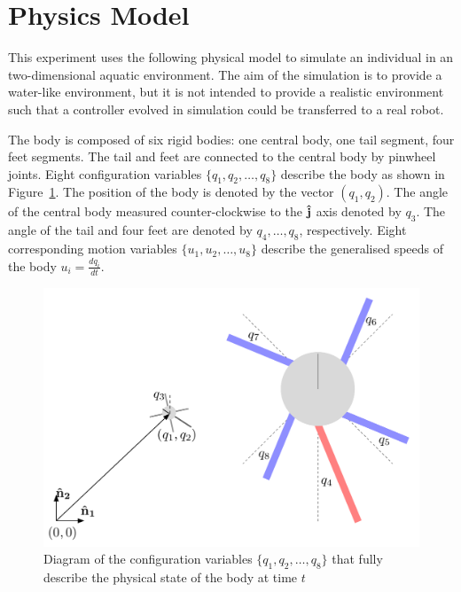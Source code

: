 \section{Physics Model}

This experiment uses the following physical model to simulate an
individual in an two-dimensional aquatic environment.  The aim of the
simulation is to provide a water-like environment, but it is not
intended to provide a realistic environment such that a controller
evolved in simulation could be transferred to a real
robot.  

The body is composed of six rigid bodies: one central body, one tail
segment, four feet segments.  The tail and feet are connected to the
central body by pinwheel joints.  Eight configuration variables
$\{q_1, q_2, \ldots, q_8\}$ describe the body as shown in
Figure~\ref{confvars}.  The position of the body is denoted by the
vector $(q_1, q_2)$.  The angle of the central body measured counter-clockwise
to the $\bf \hat j$ axis denoted by $q_3$.  The angle of the tail and
four feet are denoted by $q_4, \ldots, q_8$, respectively.  Eight
corresponding motion variables $\{u_1, u_2, \ldots, u_8\}$ describe
the generalised speeds of the body $u_i = \frac{d q_i}{d t}$.

\begin{figure}  
  \centering
  \includegraphics[scale=0.6]{fig/confvars.pdf} 
  \caption[Diagram of configuration variables]{\label{confvars}Diagram
    of the configuration variables $\{q_1, q_2, \ldots, q_8\}$ that
    fully describe the physical state of the body at time $t$}
\end{figure}

